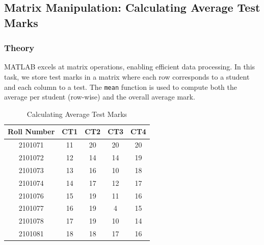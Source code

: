 \documentclass[a4paper,12pt]{article}
\begin{document}
\subsection{Matrix Manipulation: Calculating Average Test Marks}

\subsubsection*{Theory}
MATLAB excels at matrix operations, enabling efficient data processing. In this task, we store test marks in a matrix where each row corresponds to a student and each column to a test. The \texttt{mean} function is used to compute both the average per student (row-wise) and the overall average mark.

\begin{table}[H]
		\centering
	\caption{Calculating Average Test Marks }
	\begin{tabular}{|c|c|c|c|c|}
		\hline
		Roll Number & CT1 & CT2 & CT3 & CT4 \\ \hline
		2101071     & 11  & 20  & 20  & 20  \\ \hline
		2101072     & 12  & 14  & 14  & 19  \\ \hline
		2101073     & 13  & 16  & 10  & 18  \\ \hline
		2101074     & 14  & 17  & 12  & 17  \\ \hline
		2101076     & 15  & 19  & 11  & 16  \\ \hline
		2101077     & 16  & 19  & 4   & 15  \\ \hline
		2101078     & 17  & 19  & 10  & 14  \\ \hline
		2101081     & 18  & 18  & 17  & 16  \\ \hline
	\end{tabular}
\end{table}
\newpage
\end{document}
